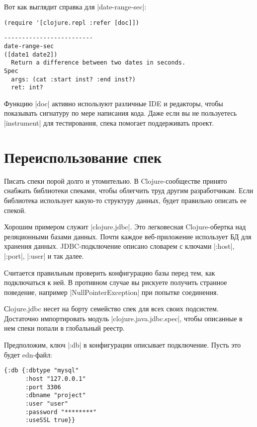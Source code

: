 Вот как выглядит справка для \spverb|date-range-sec|:

\begin{verbatim}
(require '[clojure.repl :refer [doc]])
\end{verbatim}

\begin{verbatim}
-------------------------
date-range-sec
([date1 date2])
  Return a difference between two dates in seconds.
Spec
  args: (cat :start inst? :end inst?)
  ret: int?
\end{verbatim}

Функцию \spverb|doc| активно используют различные IDE и редакторы, чтобы показывать
сигнатуру по мере написания кода. Даже если вы не пользуетесь \spverb|instrument| для
тестирования, спека помогает поддерживать проект.

\section{Переиспользование спек}

Писать спеки порой долго и утомительно. В Clojure-сообществе принято снабжать
библиотеки спеками, чтобы облегчить труд другим разработчикам. Если библиотека
использует какую-то структуру данных, будет правильно описать ее спекой.

Хорошим примером служит \spverb|clojure.jdbc|. Это легковесная Clojure-обертка над
реляционными базами данных. Почти каждое веб-приложение использует БД для
хранения данных. JDBC-подключение описано словарем с ключами \spverb|:host|, \spverb|:port|,
\spverb|:user| и так далее.

Считается правильным проверить конфигурацию базы перед тем, как подключаться к
ней. В противном случае вы рискуете получить странное поведение, например
\spverb|NullPointerException| при попытке соединения.

Сlojure.jdbc несет на борту семейство спек для всех своих подсистем. Достаточно
импортировать модуль \spverb|clojure.java.jdbc.spec|, чтобы описанные в нем спеки
попали в глобальный реестр.

Предположим, ключ \spverb|:db| в конфигурации описывает подключение. Пусть это будет
edn-файл:

\begin{verbatim}
{:db {:dbtype "mysql"
      :host "127.0.0.1"
      :port 3306
      :dbname "project"
      :user "user"
      :password "********"
      :useSSL true}}
\end{verbatim}

